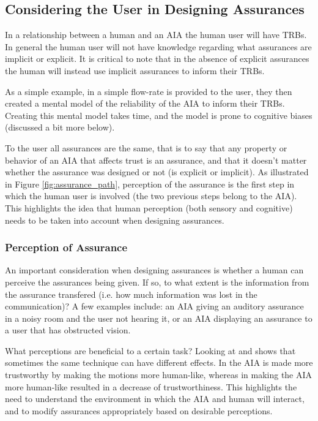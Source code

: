 \subsection{Considering the User in Designing Assurances} \label{sec:consider_human}
    In a relationship between a human and an AIA the human user will have TRBs. In general the human user will not have knowledge regarding what assurances are implicit or explicit. It is critical to note that in the absence of explicit assurances the human will instead use implicit assurances to inform their TRBs.

    As a simple example, in \cite{Muir1994-ow} a simple flow-rate is provided to the user, they then created a mental model of the reliability of the AIA to inform their TRBs. Creating this mental model takes time, and the model is prone to cognitive biases (discussed a bit more below).

    To the user all assurances are the same, that is to say that any property or behavior of an AIA that affects trust is an assurance, and that it doesn't matter whether the assurance was designed or not (is explicit or implicit). As illustrated in Figure \ref{fig:assurance_path}, perception of the assurance is the first step in which the human user is involved (the two previous steps belong to the AIA). This highlights the idea that human perception (both sensory and cognitive) needs to be taken into account when designing assurances.

\subsubsection{Perception of Assurance}
    An important consideration when designing assurances is whether a human can perceive the assurances being given. If so, to what extent is the information from the assurance transfered (i.e. how much information was lost in the communication)? A few examples include: an AIA giving an auditory assurance in a noisy room and the user not hearing it, or an AIA displaying an assurance to a user that has obstructed vision.

    What perceptions are beneficial to a certain task? Looking at \cite{Dragan2013-wd} and \cite{Wu2016-ei} shows that sometimes the same technique can have different effects. In \cite{Dragan2013-wd} the AIA is made more trustworthy by making the motions more human-like, whereas in \cite{Wu2016-ei} making the AIA more human-like resulted in a decrease of trustworthiness. This highlights the need to understand the environment in which the AIA and human will interact, and to modify assurances appropriately based on desirable perceptions.
    
